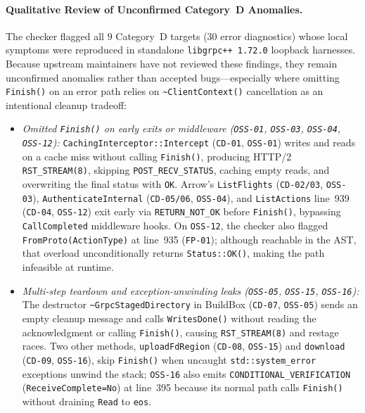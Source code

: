 \paragraph{Qualitative Review of Unconfirmed Category~D Anomalies.}
The checker flagged all $9$ Category~D targets ($30$ error diagnostics) whose local symptoms were reproduced in standalone \texttt{libgrpc++ 1.72.0} loopback harnesses. Because upstream maintainers have not reviewed these findings, they remain unconfirmed anomalies rather than accepted bugs---especially where omitting \texttt{Finish()} on an error path relies on \texttt{\~{}ClientContext()} cancellation as an intentional cleanup tradeoff:
\begin{itemize}
    \item \emph{Omitted \texttt{Finish()} on early exits or middleware (\texttt{OSS-01}, \texttt{OSS-03}, \texttt{OSS-04}, \texttt{OSS-12}):} \texttt{Caching\allowbreak Interceptor::\allowbreak Intercept} (\texttt{CD-01}, \texttt{OSS-01}) writes and reads on a cache miss without calling \texttt{Finish()}, producing HTTP/2 \texttt{RST\_STREAM(8)}, skipping \texttt{POST\_RECV\_\allowbreak STATUS}, caching empty reads, and overwriting the final status with \texttt{OK}. Arrow's \texttt{ListFlights} (\texttt{CD-02/03}, \texttt{OSS-03}), \texttt{Authenticate\allowbreak Internal} (\texttt{CD-05/06}, \texttt{OSS-04}), and \texttt{ListActions} line~939 (\texttt{CD-04}, \texttt{OSS-12}) exit early via \texttt{RETURN\_\allowbreak NOT\_\allowbreak OK} before \texttt{Finish()}, bypassing \texttt{CallCompleted} middleware hooks. On \texttt{OSS-12}, the checker also flagged \texttt{FromProto(ActionType)} at line~935 (\texttt{FP-01}); although reachable in the AST, that overload unconditionally returns \texttt{Status::OK()}, making the path infeasible at runtime.
    \item \emph{Multi-step teardown and exception-unwinding leaks (\texttt{OSS-05}, \texttt{OSS-15}, \texttt{OSS-16}):} The destructor \texttt{\~{}Grpc\allowbreak Staged\allowbreak Directory} in BuildBox (\texttt{CD-07}, \texttt{OSS-05}) sends an empty cleanup message and calls \texttt{WritesDone()} without reading the acknowledgment or calling \texttt{Finish()}, causing \texttt{RST\_STREAM(8)} and restage races. Two other methods, \texttt{uploadFdRegion} (\texttt{CD-08}, \texttt{OSS-15}) and \texttt{download} (\texttt{CD-09}, \texttt{OSS-16}), skip \texttt{Finish()} when uncaught \texttt{std::\allowbreak system\_error} exceptions unwind the stack; \texttt{OSS-16} also emits \texttt{CONDITIONAL\_\allowbreak VERIFICATION} (\texttt{Receive\allowbreak Complete=No}) at line~395 because its normal path calls \texttt{Finish()} without draining \texttt{Read} to \texttt{eos}.

\end{itemize}
